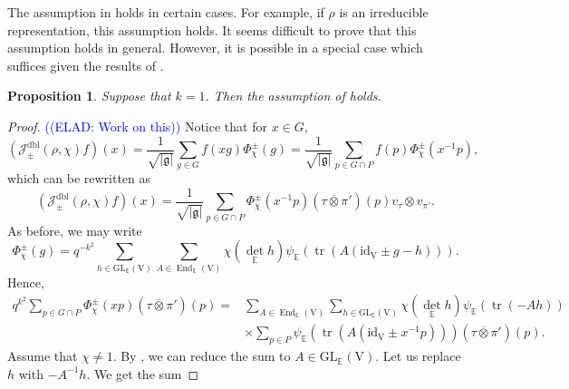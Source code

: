 \documentclass[12pt, reqno]{amsart}
\newtheorem{proposition}[theorem]{Proposition}
\theoremstyle{definition}
\theoremstyle{definition}
\theoremstyle{definition}
\newcommand{\detQuadratic}{{\det}_{\quadraticExtension}}
\newcommand{\EndomorphismRing}{\operatorname{End}}
\newcommand{\idmap}{\mathrm{id}}
\newcommand{\sizeof}[1]{\left|#1\right|}
\newcommand{\hermitianSpace}{\mathrm{V}}
\newcommand{\fieldCharacter}{\psi}
\newcommand{\trace}{\operatorname{tr}}
\newcommand{\GL}{\mathrm{GL}}
\newcommand{\quadraticExtension}{\mathbb{E}}
\newcommand{\dblJacobiSum}[2]{\mathcal{J}_{\pm}^{\mathrm{dbl}}\left(#1, #2\right)}
\newcommand{\genJacobiKernel}[1]{\Phi^{\pm}_{#1}}
\newcommand{\lieAlgebra}{\mathfrak{g}}
\newcommand{\elad}[1]{\textcolor{blue}{\sffamily ((ELAD: #1))}}
\begin{document}
The assumption in  holds in certain cases. For example, if $\rho$ is an irreducible representation, this assumption holds. It seems difficult to prove that this assumption holds in general. However, it is possible in a special case which suffices given the results of \cite{GirschZelingher2025}.

\begin{proposition}
	Suppose that $k=1$. Then the assumption of  holds.
\end{proposition}
\begin{proof}\elad{Work on this}
	Notice that for $x \in G$, $$\left(\dblJacobiSum{\rho}{\chi} f\right)\left(x\right) = \frac{1}{\sqrt{\sizeof{\lieAlgebra}}} \sum_{g \in G} f\left(xg\right) \genJacobiKernel{\chi}\left(g\right) = \frac{1}{\sqrt{\sizeof{\lieAlgebra}}} \sum_{p \in G \cap P} f\left(p\right) \genJacobiKernel{\chi}\left(x^{-1} p\right),$$
	which can be rewritten as
	$$\left(\dblJacobiSum{\rho}{\chi} f\right)\left(x\right) = \frac{1}{\sqrt{\sizeof{\lieAlgebra}}} \sum_{p \in G \cap P}  \genJacobiKernel{\chi}\left(x^{-1} p\right) \left(\tau \overline{\otimes} \pi'\right)\left(p\right) v_\tau \otimes v_{\pi'}.$$
	As before, we may write
	$$\genJacobiKernel{\chi}\left(g\right) = q^{-k^2} \sum_{h \in \GL_{\quadraticExtension}\left(\hermitianSpace\right)} \sum_{A \in \EndomorphismRing_{\quadraticExtension}\left(\hermitianSpace\right)} \chi\left(\detQuadratic h\right) \fieldCharacter_{\quadraticExtension}\left(\trace\left(A \left(\idmap_{\hermitianSpace} \pm g - h \right)\right)\right).$$
	Hence, \begin{align*}
		q^{k^2} \sum_{p \in G \cap P} \genJacobiKernel{\chi}\left(xp\right) \left(\tau \overline{\otimes} \pi'\right)\left(p\right) =& \sum_{A \in \EndomorphismRing_{\quadraticExtension}\left(\hermitianSpace\right)} \sum_{h \in \GL_{\quadraticExtension}\left(\hermitianSpace\right)} \chi\left(\detQuadratic h\right)\fieldCharacter_{\quadraticExtension}\left(\trace\left(-Ah\right)\right) \\
		& \times \sum_{p \in P} \fieldCharacter_{\quadraticExtension}\left(\trace\left(A \left(\idmap_{\hermitianSpace} \pm x^{-1} p\right)\right)\right) \left(\tau \overline{\otimes} \pi'\right)\left(p\right).
	\end{align*}
	Assume that $\chi \ne 1$. By , we can reduce the sum to $A \in \GL_{\quadraticExtension}\left(\hermitianSpace\right)$. Let us replace $h$ with $-A^{-1} h$. We get the sum

\end{proof}
\end{document}
